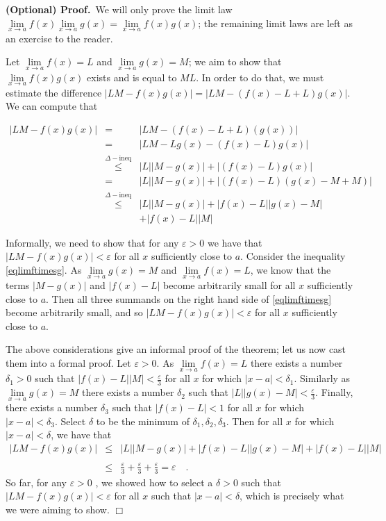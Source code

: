 \documentclass[12pt]{book}
\newenvironment{proofOptional}[1][]{ \noindent \textbf{(Optional) Proof#1.}}{$\Box$\medskip}
\begin{document}
\begin{proofOptional}~We will only prove the limit law $\displaystyle \lim\limits_{x\to a} f(x)\lim\limits_{x\to a}  g(x)= \lim\limits_{x\to a} f(x) g(x)$; the remaining limit laws are left as an exercise to the reader.

Let $\lim\limits_{x\to a}f(x)=L$ and $\lim\limits_{x\to a}g(x)=M$; we aim to show that $\lim\limits_{x\to a} f(x)g(x) $ exists and is equal to $M L$. In order to do that, we must estimate the difference $ |L M - f(x)g(x)|=|L M - (f(x)-L+L)g(x)|$. We can compute that 

\begin{equation}\label{eqlimftimesg}
\begin{array}{rcl}
|L M - f(x)g(x)|&=&|L M - (f(x)-L+L)(g(x))|\\&=& |LM-L g(x) - (f(x)-L)g(x)  |\\& \stackrel{\Delta-\text{ineq}}{\leq}& |L||M-g(x)|+|(f(x)-L)g(x)| \\
&=& |L||M-g(x)|+|(f(x)-L)(g(x)-M+M)|\\
&\stackrel{\Delta-\text{ineq}}{\leq}& |L||M-g(x)|+ |f(x)-L||g(x)-M|
\\&&+ |f(x)-L||M| 
\end{array}
\end{equation}

Informally, we need to show that for any $\varepsilon>0$ we have that $|LM-f(x)g(x)|<\varepsilon$ for all $x$ sufficiently close to $a$. Consider the inequality \eqref{eqlimftimesg}. As $\lim\limits_{x\to a} g(x)=M$ and $\lim\limits_{x\to a}f(x)=L $, we know that the terms $|M-g(x)|$ and $|f(x)-L|$ become arbitrarily small for all $x$ sufficiently close to $a$. Then all three summands on the right hand side of \eqref{eqlimftimesg} become arbitrarily small, and so $|LM-f(x)g(x)|<\varepsilon$ for all $x$ sufficiently close to $a$.

The above considerations give an informal proof of the theorem; let us now cast them into a formal proof. Let $\varepsilon>0$. As $\lim\limits_{x\to a}f(x)=L$ there exists a number $\delta_1>0$ such that $|f(x)-L| |M|<\frac{\varepsilon}3$ for all $x$ for which $|x-a|<\delta_1$. Similarly as $\lim\limits_{x\to a}g(x)=M$ there exists a number $\delta_2$ such that $|L||g(x)-M| <\frac{\varepsilon}3$. Finally, there exists a number $\delta_3$ such that $|f(x)-L|<1 $ for all  $x$ for which $|x-a|<\delta_3$. Select $\delta $ to be the minimum of $\delta_1, \delta_2, \delta_3$. Then  for all $x$ for which $|x-a|<\delta$, we have that 
\[
\begin{array}{rcl}
\displaystyle |L M - f(x)g(x)|&\leq&\displaystyle |L||M-g(x)|+ |f(x)-L||g(x)-M|+ |f(x)-L||M| \\~\\&\leq&\displaystyle \frac{\varepsilon}{3}+\frac{\varepsilon}{3}+\frac{\varepsilon}{3}=\varepsilon\quad .
\end{array}
\]
So far, for any $\varepsilon>0$ , we showed how to select a $\delta>0$ such that $|LM-f(x)g(x)|<\varepsilon$ for all $x$ such that $|x-a|<\delta$, which is precisely what we were aiming to show.
\end{proofOptional}
 
\end{document}
